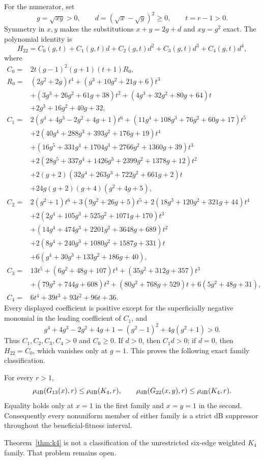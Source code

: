 For the numerator, set
\[
 g=\sqrt{xy}>0,\qquad d=(\sqrt{x}-\sqrt{y})^2\ge0,
 \qquad t=r-1>0.
\]
Symmetry in $x,y$ makes the substitutions $x+y=2g+d$ and $xy=g^2$ exact.
The polynomial identity is
\begin{equation}
 H_{22}=C_0(g,t)+C_1(g,t)d+C_2(g,t)d^2+C_3(g,t)d^3+C_4(g,t)d^4, \label{eq:k4-sos}
\end{equation}
where
\begin{align*}
 C_0={}&2t(g-1)^2(g+1)(t+1)R_0,\\
 R_0={}&(2g^2+2g)t^4+(g^3+10g^2+21g+6)t^3\\
 &+(3g^3+26g^2+61g+38)t^2+(4g^3+32g^2+80g+64)t\\
 &+2g^3+16g^2+40g+32,\\[2pt]
 C_1={}&2(g^4+4g^3-2g^2+4g+1)t^6
 +(11g^4+108g^3+76g^2+60g+17)t^5\\
 &+2(40g^4+288g^3+393g^2+176g+19)t^4\\
 &+(16g^5+331g^4+1704g^3+2766g^2+1360g+39)t^3\\
 &+2(28g^5+337g^4+1426g^3+2399g^2+1378g+12)t^2\\
 &+2(g+2)(32g^4+263g^3+722g^2+661g+2)t\\
 &+24g(g+2)(g+4)(g^2+4g+5),\\[2pt]
 C_2={}&2(g^2+1)t^6+3(9g^2+26g+5)t^5
 +2(18g^3+120g^2+321g+44)t^4\\
 &+2(2g^4+105g^3+525g^2+1071g+170)t^3\\
 &+(14g^4+474g^3+2201g^2+3648g+689)t^2\\
 &+2(8g^4+240g^3+1080g^2+1587g+331)t\\
 &+6(g^4+30g^3+133g^2+186g+40),\\[2pt]
 C_3={}&13t^5+(6g^2+48g+107)t^4+(35g^2+312g+357)t^3\\
 &+(79g^2+744g+608)t^2+(80g^2+768g+529)t
 +6(5g^2+48g+31),\\
 C_4={}&6t^4+39t^3+93t^2+96t+36.
\end{align*}
Every displayed coefficient is positive except for the superficially
negative monomial in the leading coefficient of $C_1$, and
\[
 g^4+4g^3-2g^2+4g+1=(g^2-1)^2+4g(g^2+1)>0.
\]
Thus $C_1,C_2,C_3,C_4>0$ and $C_0\ge0$.  If $d>0$, then $C_1d>0$; if
$d=0$, then $H_{22}=C_0$, which vanishes only at $g=1$.  This proves the
following exact family classification.

\begin{theorem}\label{thm:k4}
For every $r>1$,
\[
 \rho_{\mathrm{dB}}(G_{13}(x),r)\le\rho_{\mathrm{dB}}(K_4,r),\qquad
 \rho_{\mathrm{dB}}(G_{22}(x,y),r)\le\rho_{\mathrm{dB}}(K_4,r).
\]
Equality holds only at $x=1$ in the first family and $x=y=1$ in the second.
Consequently every nonuniform member of either family is a strict dB
suppressor throughout the beneficial-fitness interval.
\end{theorem}

Theorem~\ref{thm:k4} is not a classification of the unrestricted six-edge
weighted $K_4$ family.  That problem remains open.
